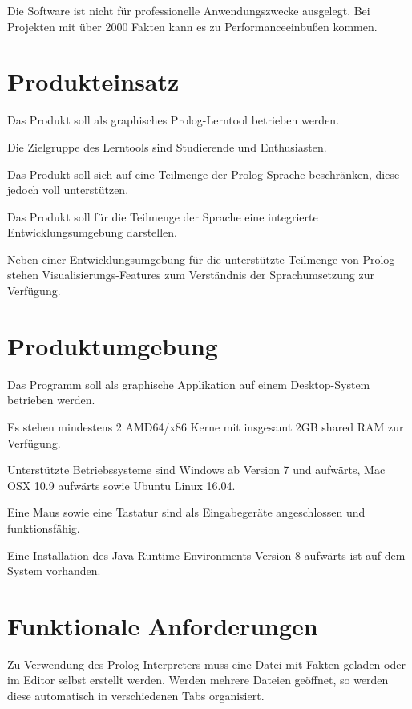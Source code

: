 \documentclass[parskip=full,11pt,twoside]{scrartcl}
\begin{document}
Die Software ist nicht für professionelle Anwendungszwecke ausgelegt. Bei Projekten mit über 2000 Fakten kann es zu Performanceeinbußen kommen.

\pagebreak
\section{Produkteinsatz}

Das Produkt soll als graphisches Prolog-Lerntool betrieben werden.

Die Zielgruppe des Lerntools sind Studierende und Enthusiasten.

Das Produkt soll sich auf eine Teilmenge der Prolog-Sprache beschränken, diese jedoch voll unterstützen.

Das Produkt soll für die Teilmenge der Sprache eine integrierte Entwicklungsumgebung darstellen.

Neben einer Entwicklungsumgebung für die unterstützte Teilmenge von Prolog stehen Visualisierungs-Features zum Verständnis der Sprachumsetzung zur Verfügung.

\section{Produktumgebung}

Das Programm soll als graphische Applikation auf einem Desktop-System betrieben werden.

Es stehen mindestens 2 AMD64/x86 Kerne mit insgesamt 2GB shared RAM zur Verfügung.

Unterstützte Betriebssysteme sind Windows ab Version 7 und aufwärts, Mac OSX 10.9 aufwärts sowie Ubuntu Linux 16.04.

Eine Maus sowie eine Tastatur sind als Eingabegeräte angeschlossen und funktionsfähig.

Eine Installation des Java Runtime Environments Version 8 aufwärts ist auf dem System vorhanden.

\section{Funktionale Anforderungen}


Zu Verwendung des Prolog Interpreters muss eine Datei mit Fakten geladen oder im Editor selbst erstellt werden. Werden mehrere Dateien geöffnet, so werden diese automatisch in verschiedenen Tabs organisiert.
\end{document}

